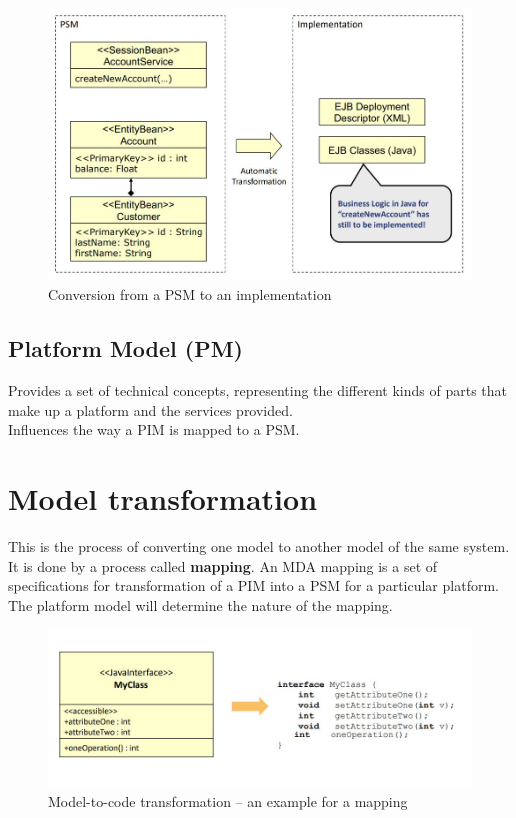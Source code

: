 		\begin{figure}[h!]
			\includegraphics[scale=0.5]{res/psm-to-impl.jpg}
			\caption{Conversion from a PSM to an implementation}
		\end{figure}	 
			 
			 
		\subsection{Platform Model (PM)}
			Provides a set of technical concepts, representing the different kinds of parts that make up a
			platform and the services provided.\\
			Influences the way a PIM is mapped to a PSM.\Biglb			
			
		
	\section{Model transformation}
		This is the process of converting one model to another model of the same system. It is done by a process called \textbf{mapping}. An MDA mapping is a set of specifications for transformation of a PIM into a PSM for a particular platform. The platform model will determine the nature of the mapping.
		\begin{figure}[h!]
			\includegraphics[scale=0.6]{res/mda-model-to-code-transformation.JPG}
			\caption{Model-to-code transformation -- an example for a mapping}
		\end{figure}
		
